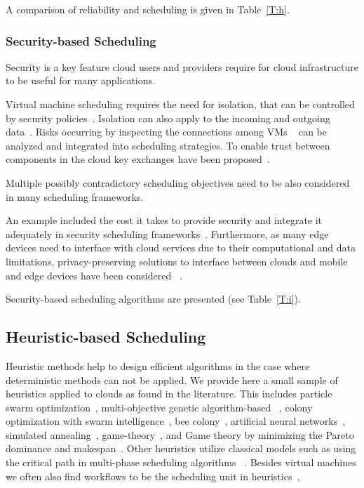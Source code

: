 \documentclass[final,5p,times,twocolumn]{elsarticle}
\begin{document}
A comparison of reliability and scheduling is given in Table~\ref{T:h}.

%

\subsubsection{Security-based Scheduling}\label{sec:security}


Security is a key feature cloud users and providers require for cloud infrastructure to be useful for many applications.

Virtual machine scheduling requires the need for isolation, that can be controlled by security policies~\cite{afoulki2011security}. Isolation can also apply to the incoming and outgoing data~\cite{chejerla2017qos,kashyap2014security}. Risks occurring by inspecting the connections among VMs ~\cite{shetty2016security} can be analyzed and integrated into scheduling strategies. To enable trust between components in the cloud key exchanges have been proposed~\cite{liu2013ccbke}.

Multiple possibly contradictory scheduling objectives need to be also considered in many scheduling frameworks.

An example included the cost it takes to provide security and integrate it adequately in security scheduling frameworks~\cite{kashyap2014security,zeng2015saba,wang2012cloud}. Furthermore, as many edge devices need to interface with cloud services due to their computational and data limitations, privacy-preserving solutions to interface between clouds and mobile and edge devices have been considered ~\cite{bilogrevic2011meetings}.

Security-based scheduling algorithms are presented (see Table~\ref{T:i}).



%

\subsection{Heuristic-based Scheduling}\label{sec:heuristic}


Heuristic methods help to design efficient algorithms in the case where deterministic methods can not be applied. We provide here a small sample of heuristics applied to clouds as found in the literature. This includes particle swarm optimization~\cite{pandey2010particle}, multi-objective genetic algorithm-based ~\cite{mezmaz2011parallel,gkasior2016metaheuristic}, colony optimization with swarm intelligence~\cite{mateos2013aco}, bee colony~\cite{ld2013honey}, artificial neural networks~\cite{kousiouris2011effects}, simulated annealing~\cite{torabzadeh2010cloud}, game-theory~\cite{gkasior2016metaheuristic}, and Game theory by minimizing the Pareto dominance and makespan~\cite{su2013cost}. Other heuristics utilize classical models such as using the critical path in multi-phase scheduling algorithms ~\cite {abrishami2013deadline}. Besides virtual machines we often also find workflows to be the scheduling unit in heuristics~\cite{bousselmi2016qos}.
\end{document}

